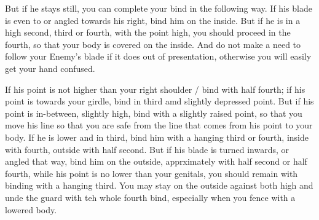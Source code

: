 \newpage


\newpage



But if he stays still, you can complete your bind in the following
way. If his blade is even to or angled towards his right, bind him on
the inside. But if he is in a high second, third or fourth, with the
point high, you should proceed in the fourth, so that your body is
covered on the inside. And do not make a need to follow your Enemy's
blade if it does out of presentation, otherwise you will easily get
your hand confused.


If his point is not higher than your right shoulder / bind with half
fourth; if his point is towards your girdle, bind in third amd
slightly depressed point. But if his point is in-between, slightly
high, bind with a slightly raised point, so that you move his line so
that you are safe from the line that comes from his point to your
body. If he is lower and in third, bind him with a hanging third or
fourth, inside with fourth, outside with half second. But if his blade
is turned inwards, or angled that way, bind him on the outside,
apprximately with half second or half fourth, while his point is no
lower than your genitals, you should remain with binding with a
hanging third. You may stay on the outside against both high and unde
the guard with teh whole fourth bind, especially when you fence with a
lowered body.

